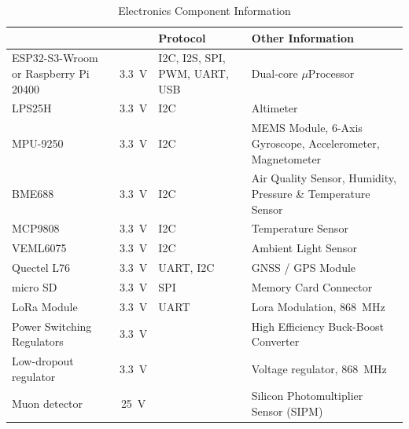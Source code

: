 \begin{table}[htbp]
\centering
{}
\begin{tabularx}{0.95\textwidth}{>{\raggedright\arraybackslash}p{3.5cm}c>{\raggedright\arraybackslash}X>{\raggedright\arraybackslash}p{5.5cm}}
\hline
\rowcolor{DeepSkyBlue4}
\textbf{\color{white!50}{Component}} & \textbf{\color{white!50}{Voltage}} & \textbf{\color{white!50}\textbf{Protocol}} & \textbf{\color{white!50}\textbf{Other Information}} \\ \hline
\rowcolors{2}{red}{}
ESP32-S3-Wroom or Raspberry Pi 20400& \SI{3.3}{\volt} & I2C, I2S, SPI, PWM, UART, USB & {Dual-core $\mu$Processor}\\ %
\rowcolor{LightCyan1!50}LPS25H & \SI{3.3}{\volt} & I2C & Altimeter\\ %
MPU-9250 & \SI{3.3}{\volt} & I2C & MEMS Module, 6-Axis Gyroscope,\/ Accelerometer,\/ Magnetometer\\ %
\rowcolor{LightCyan1!50}BME688 & \SI{3.3}{\volt} & I2C & Air Quality Sensor, Humidity, Pressure \& Temperature Sensor\\ %
MCP9808 & \SI{3.3}{\volt} & I2C & Temperature Sensor\\ %
\rowcolor{LightCyan1!50}VEML6075 & \SI{3.3}{\volt} & I2C & Ambient Light Sensor\\ %
Quectel L76 & \SI{3.3}{\volt} & UART, I2C & GNSS / GPS Module\\ %
\rowcolor{LightCyan1!50}micro SD & \SI{3.3}{\volt} & SPI & Memory Card Connector\\ %
LoRa Module& \SI{3.3}{\volt} & UART & Lora Modulation, \SI{868}{\mega\hertz} \\ %
\rowcolor{LightCyan1!50}Power Switching Regulators & \SI{3.3}{\volt} & & High Efficiency Buck-Boost Converter  \\ %
Low-dropout regulator& \SI{3.3}{\volt} & & Voltage regulator, \SI{868}{\mega\hertz} \\ %
\rowcolor{LightCyan1!50}Muon detector & \SI{25}{\volt} & & Silicon Photomultiplier Sensor (SIPM)  \\ %
\end{tabularx}
\caption{\small{Electronics Component Information}}
\end{table}

